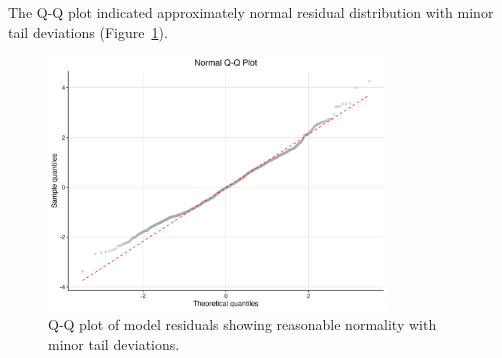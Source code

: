 The Q-Q plot indicated approximately normal residual distribution with minor tail deviations (Figure~\ref{fig:qqplot}).

\begin{figure}[htbp]
\centering
\includegraphics[width=0.8\textwidth]{supplemental/results/thesis_exports/figures/qq_plot.png}
\caption{Q-Q plot of model residuals showing reasonable normality with minor tail deviations.}\label{fig:qqplot}
\end{figure}

